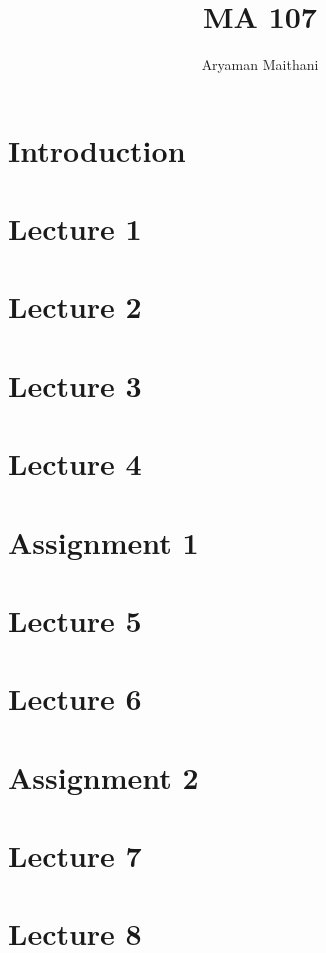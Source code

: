 \documentclass[12 pt, a4paper, toc=graduated, oneside]{book}
\title{MA 107}
\author{Aryaman Maithani}
\date{}
\begin{document}
\frontmatter
\maketitle
\tableofcontents
\newpage
\chapter{Introduction}

%
\mainmatter
{}
\chapter{Lecture 1}

%
\chapter{Lecture 2}

%
\chapter{Lecture 3}

%
\chapter{Lecture 4}

%
\chapter*{Assignment 1}\label{assign:1}

%
\chapter{Lecture 5}

%
\chapter{Lecture 6}

%
\chapter*{Assignment 2}\label{assign:2}

%
\chapter{Lecture 7}

%
\chapter{Lecture 8}

%
\end{document}
